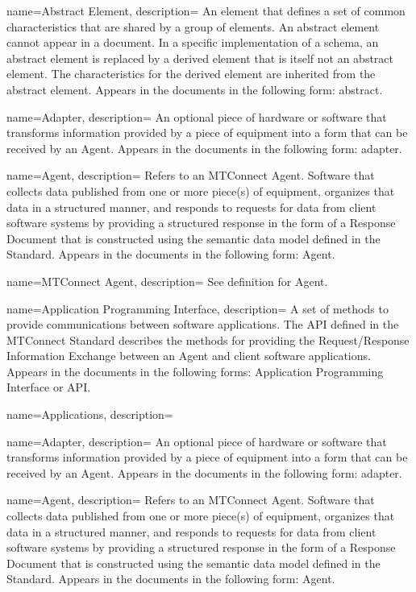 
{
    name={Abstract Element},
	description={
  An element that defines a set of common characteristics that are shared by a group of elements.
  An abstract element cannot appear in a document. In a specific implementation of a schema, an abstract element is replaced by a derived element that is itself not an abstract element. The characteristics for the derived element are inherited from the abstract element. 
  Appears in the documents in the following form: abstract.
}
}

{
    name={Adapter},
	description={
  An optional piece of hardware or software that transforms information provided by a piece of equipment into a form that can be received by an \gls{Agent}.
  Appears in the documents in the following form: adapter.
}
}

{
    name={Agent},
	description={
  Refers to an MTConnect Agent. 
  Software that collects data published from one or more piece(s) of equipment, organizes that data in a structured manner, and responds to requests for data from client software systems by providing a structured response in the form of a \gls{Response Document} that is constructed using the \gls{semantic data model} defined in the Standard. 
  Appears in the documents in the following form: \gls{Agent}.
}
}

{
    name={MTConnect Agent},
	description={
	See definition for \gls{Agent}.
}
}

{
    name={Application Programming Interface},
	description={
  A set of methods to provide communications between software applications.
  The API defined in the MTConnect Standard describes the methods for providing the \gls{Request/Response} Information Exchange between an \gls{Agent} and client software applications.
  Appears in the documents in the following forms: Application Programming Interface or API.
}
}

{
    name={Applications},
	description={}
}

{
    name={Adapter},
	description={
  An optional piece of hardware or software that transforms information provided by a piece of equipment into a form that can be received by an \gls{Agent}.
  Appears in the documents in the following form: adapter.
}
}

{
    name={Agent},
	description={
  Refers to an MTConnect Agent. 
  Software that collects data published from one or more piece(s) of equipment, organizes that data in a structured manner, and responds to requests for data from client software systems by providing a structured response in the form of a \gls{Response Document} that is constructed using the \gls{semantic data model} defined in the Standard. 
  Appears in the documents in the following form: \gls{Agent}.
}
}

